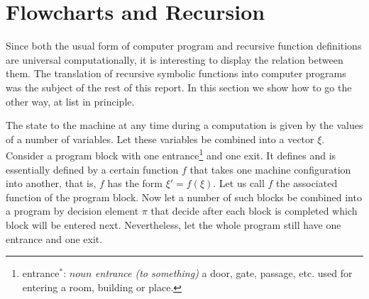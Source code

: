 \documentclass[11pt, a4paper]{article}
\begin{document}
\section{Flowcharts and Recursion}

Since both the usual form of computer program and recursive function definitions
are universal computationally, it is interesting to display the relation between
them. The translation of recursive symbolic functions into computer programs was
the subject of the rest of this report. In this section we show how to go the
other way, at list in principle.

The state to the machine at any time during a computation is given by the values
of a number of variables. Let these variables be combined into a vector
$\xi$. Consider a program block with one
entrance\footnote{entrance$^*$: $noun$ \textit{entrance (to something)} a door,
  gate, passage, etc. used for entering a room, building or place.}
and one exit. It defines and
is essentially defined by a certain function $f$ that takes one machine
configuration into another, that is, $f$ has the form $\xi' = f(\xi)$. Let us
call $f$ the associated function of the program block. Now let a number of such
blocks be combined into a program by decision element $\pi$ that decide after
each block is completed which block will be entered next. Nevertheless, let the
whole program still have one entrance and one exit.

\begin{figure}[h]
  \center
  \caption{}
\end{figure}
\end{document}
